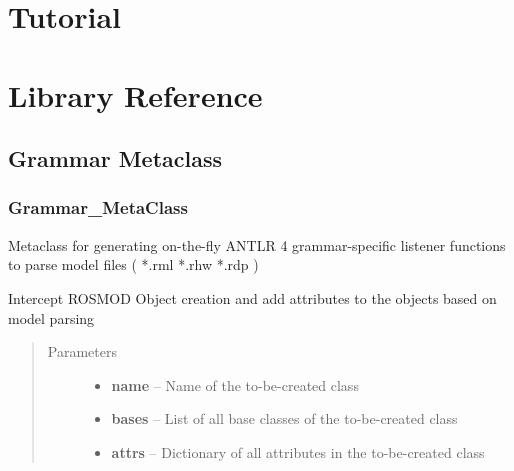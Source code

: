 \documentclass[letterpaper,10pt,english]{sphinxmanual}
\begin{document}
\section{Tutorial}
\label{Tutorial::doc}\label{Tutorial:tutorial}

\section{Library Reference}
\label{Library_Reference:library-reference}\label{Library_Reference::doc}\label{Library_Reference:id1}

\subsection{Grammar Metaclass}
\label{Library_Reference:grammar-metaclass}

\subsubsection{Grammar\_MetaClass}
\label{class_Grammar_MetaClass:grammar-metaclass}\label{class_Grammar_MetaClass::doc}\label{class_Grammar_MetaClass:id1}

\begin{fulllineitems}
\label{class_Grammar_MetaClass:Grammar_MetaClass}
Metaclass for generating on-the-fly ANTLR 4 grammar-specific listener functions to parse model files ( *.rml \textbar{} *.rhw \textbar{} *.rdp )

\begin{fulllineitems}
\label{class_Grammar_MetaClass:Grammar_MetaClass.__new__}
Intercept ROSMOD Object creation and add attributes to the objects based on model parsing
\begin{quote}\begin{description}
\item[{Parameters}] \leavevmode\begin{itemize}
\item {} 
\textbf{name} -- Name of the to-be-created class

\item {} 
\textbf{bases} -- List of all base classes of the to-be-created class

\item {} 
\textbf{attrs} -- Dictionary of all attributes in the to-be-created class

\end{itemize}

\end{description}\end{quote}

\end{fulllineitems}


\end{fulllineitems}
\end{document}
